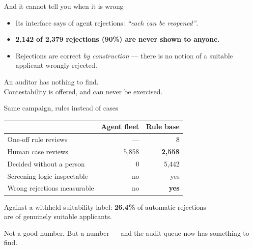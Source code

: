 \documentclass[aspectratio=169,11pt]{beamer}
\begin{document}
\begin{frame}{And it cannot tell you when it is wrong}
  \vspace{1.1em}
  \begin{itemize}
    \setlength\itemsep{.9em}
    \item Its interface says of agent rejections: \emph{``each can be reopened''}.
    \item \textbf{2,142 of 2,379 rejections (90\%) are never shown to anyone.}
    \item Rejections are correct \emph{by construction} --- there is no notion of
      a suitable applicant wrongly rejected.
  \end{itemize}
  \vspace{1.4em}
  \pause
  \begin{center}\color{pinedark}
    An auditor has nothing to find.\\
    Contestability is offered, and can never be exercised.
  \end{center}
\end{frame}

\begin{frame}{Same campaign, rules instead of cases}
  \vspace{.7em}
  \begin{center}
  \begin{tabular}{lrr}
    \toprule
    & \textbf{Agent fleet} & \textbf{Rule base} \\
    \midrule
    One-off rule reviews        & ---     & 8 \\
    Human case reviews          & 5,858   & \textbf{2,558} \\
    Decided without a person    & 0       & 5,442 \\
    Screening logic inspectable & no      & yes \\
    Wrong rejections measurable & no      & \textbf{yes} \\
    \bottomrule
  \end{tabular}
  \end{center}
  \vspace{1.1em}
  \pause
  \begin{center}
    Against a withheld suitability label:
    \textbf{\color{amber}26.4\%} of automatic rejections\\
    are of genuinely suitable applicants.
    \vspace{.5em}

    {\color{muted}Not a good number. But a number --- and the audit queue
    now has something to find.}
  \end{center}
\end{frame}
\end{document}
